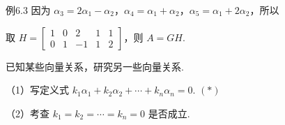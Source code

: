\begin{fcard}{例6.3}
因为 $\alpha_3=2\alpha_1-\alpha_2$，$\alpha_4=\alpha_1+\alpha_2$，$\alpha_5=\alpha_1+2\alpha_2$，所以


取 $H=\begin{bmatrix}1&0&2&1&1\\0&1&-1&1&2\end{bmatrix}$，则 $A=GH$.
\end{fcard}





已知某些向量关系，研究另一些向量关系.

（1）写定义式 $k_1\alpha_1+k_2\alpha_2+\cdots+k_n\alpha_n=0$. \hfill $(*)$

（2）考查 $k_1=k_2=\cdots=k_n=0$ 是否成立.

